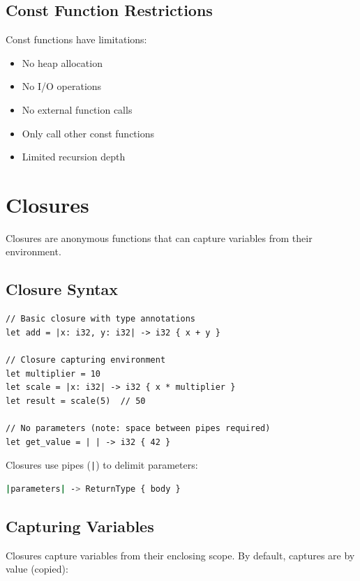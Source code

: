 \subsection{Const Function Restrictions}
\label{subsec:const-fn-restrictions}

Const functions have limitations:
\begin{itemize}
    \item No heap allocation
    \item No I/O operations
    \item No external function calls
    \item Only call other const functions
    \item Limited recursion depth
\end{itemize}

\section{Closures}
\label{sec:closures}

Closures are anonymous functions that can capture variables from their environment.

\subsection{Closure Syntax}
\label{subsec:closure-syntax}

\begin{lstlisting}
// Basic closure with type annotations
let add = |x: i32, y: i32| -> i32 { x + y }

// Closure capturing environment
let multiplier = 10
let scale = |x: i32| -> i32 { x * multiplier }
let result = scale(5)  // 50

// No parameters (note: space between pipes required)
let get_value = | | -> i32 { 42 }
\end{lstlisting}

Closures use pipes (\texttt{|}) to delimit parameters:

\begin{lstlisting}[language=bash]
|parameters| -> ReturnType { body }
\end{lstlisting}

\subsection{Capturing Variables}
\label{subsec:capturing}

Closures capture variables from their enclosing scope. By default, captures are by value (copied):


